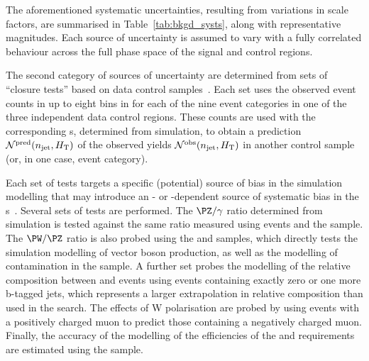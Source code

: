 The aforementioned systematic uncertainties, resulting from variations
in scale factors, are summarised in Table~\ref{tab:bkgd_systs}, along
with representative magnitudes.  Each source of uncertainty is assumed
to vary with a fully correlated behaviour across the full phase space
of the signal and control regions.

The second category of sources of uncertainty are determined from sets
of ``closure tests'' based on data control
samples~\cite{RA1Paper2012}. Each set uses the observed event counts
in up to eight bins in \scalht for each of the nine \njet event
categories in one of the three independent data control regions. These
counts are used with the corresponding {\tf}s, determined from
simulation, to obtain a prediction $\mathcal{N}^\text{pred}(n_{\text{jet}},
H_{\mathrm{T}})$ of the observed yields $\mathcal{N}^\text{obs}(n_{\text{jet}},
H_{\mathrm{T}})$ in another control sample (or, in one case, \nb event
category).

Each set of tests targets a specific (potential) source of bias in the
simulation modelling that may introduce an \njet- or \scalht-dependent
source of systematic bias in the {\tf}s~\cite{RA1Paper2012}. Several
sets of tests are performed. The $\PZ/\gamma$ ratio determined from
simulation is tested against the same ratio measured using \zmumuj
events and the \gj sample.
The $\PW/\PZ$ ratio is also probed using the \mj and \mmj
samples, which directly tests the simulation modelling of vector
boson production, as well as the modelling of \ttbar contamination in
the \mj sample. 
A further set probes the modelling of the relative composition between
\wlj and \ttbar events using \mj events containing exactly zero or one
more b-tagged jets, which represents a larger extrapolation in
relative composition than used in the search.  The effects of W
polarisation are probed by using \mj events with a positively charged
muon to predict those containing a negatively charged muon. Finally,
the accuracy of the modelling of the efficiencies of the \alphat and
\bdphi requirements are estimated using the \mj sample.

